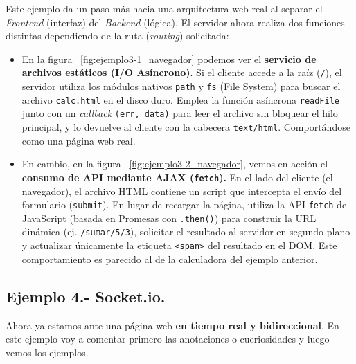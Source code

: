 \documentclass[a4paper,12pt]{article}
\begin{document}
				Este ejemplo da un paso más hacia una arquitectura web real al separar el \textit{Frontend} (interfaz) del \textit{Backend} (lógica). El servidor ahora realiza dos funciones distintas dependiendo de la ruta (\textit{routing}) solicitada:
				
				\begin{itemize}
					\item  En la figura ~\ref{fig:ejemplo3-1_navegador} podemos ver el \textbf{servicio de archivos estáticos (I/O Asíncrono)}. Si el cliente accede a la raíz (\texttt{/}), el servidor utiliza los módulos nativos \texttt{path} y \texttt{fs} (File System) para buscar el archivo \texttt{calc.html} en el disco duro. Emplea la función asíncrona \texttt{readFile} junto con un \textit{callback} \texttt{(err, data)} para leer el archivo sin bloquear el hilo principal, y lo devuelve al cliente con la cabecera \texttt{text/html}. Comportándose como una página web real.
					
					\item En cambio, en la figura ~\ref{fig:ejemplo3-2_navegador}, vemos en acción el \textbf{consumo de API mediante AJAX (\texttt{fetch}).} En el lado del cliente (el navegador), el archivo HTML contiene un script que intercepta el envío del formulario (\texttt{submit}). En lugar de recargar la página, utiliza la API \texttt{fetch} de JavaScript (basada en Promesas con \texttt{.then()}) para construir la URL dinámica (ej. \texttt{/sumar/5/3}), solicitar el resultado al servidor en segundo plano y actualizar únicamente la etiqueta \texttt{<span>} del resultado en el DOM. Este comportamiento es parecido al de la calculadora del ejemplo anterior.
				\end{itemize}

		\subsection{Ejemplo 4.- Socket.io.}
			Ahora ya estamos ante una página web \textbf{en tiempo real y bidireccional}. En este ejemplo voy a comentar primero las anotaciones o cueriosidades y luego vemos los ejemplos.
			
\end{document}
